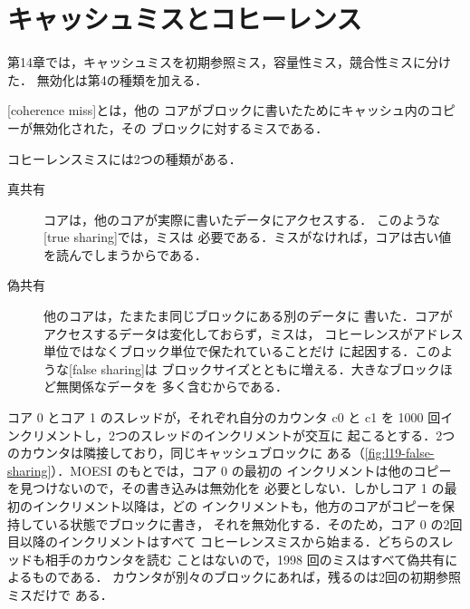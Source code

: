 \documentclass[../main.tex]{subfiles}
\begin{document}
\section{キャッシュミスとコヒーレンス}
\label{sec:l19-misses}

第14章では，キャッシュミスを初期参照ミス，容量性ミス，競合性ミスに分けた．
無効化は第4の種類を加える．

\begin{definition}[コヒーレンスミス]
  [coherence miss]とは，他の
  コアがブロックに書いたためにキャッシュ内のコピーが無効化された，その
  ブロックに対するミスである．
\end{definition}

コヒーレンスミスには2つの種類がある．
\begin{description}
  \item[真共有] コアは，他のコアが実際に書いたデータにアクセスする．
    このような[true sharing]では，ミスは
    必要である．ミスがなければ，コアは古い値を読んでしまうからである．
  \item[偽共有] 他のコアは，たまたま同じブロックにある別のデータに
    書いた．コアがアクセスするデータは変化しておらず，ミスは，
    コヒーレンスがアドレス単位ではなくブロック単位で保たれていることだけ
    に起因する．このような[false sharing]は
    ブロックサイズとともに増える．大きなブロックほど無関係なデータを
    多く含むからである．
\end{description}

\begin{example}
  \label{ex:l19-false-sharing}
  コア 0 とコア 1 のスレッドが，それぞれ自分のカウンタ c0 と c1 を
  \num{1000} 回インクリメントし，2つのスレッドのインクリメントが交互に
  起こるとする．2つのカウンタは隣接しており，同じキャッシュブロックに
  ある（\cref{fig:l19-false-sharing}）．MOESI のもとでは，コア 0 の最初の
  インクリメントは他のコピーを見つけないので，その書き込みは無効化を
  必要としない．しかしコア 1 の最初のインクリメント以降は，どの
  インクリメントも，他方のコアがコピーを保持している状態でブロックに書き，
  それを無効化する．そのため，コア 0 の2回目以降のインクリメントはすべて
  コヒーレンスミスから始まる．どちらのスレッドも相手のカウンタを読む
  ことはないので，\num{1998} 回のミスはすべて偽共有によるものである．
  カウンタが別々のブロックにあれば，残るのは2回の初期参照ミスだけで
  ある．
\end{example}
\begin{marginfigure}
  \resizebox{\linewidth}{!}{}
  \caption{偽共有: 異なるコアが使うカウンタが同じキャッシュブロックに
    ある．}
  \label{fig:l19-false-sharing}
\end{marginfigure}
\end{document}
